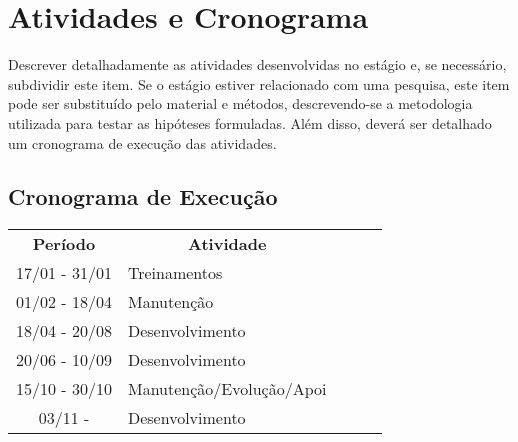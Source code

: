 \chapter[Atividades e Cronograma]{Atividades e Cronograma}

Descrever detalhadamente as atividades desenvolvidas no estágio e, se necessário, 
subdividir este item. Se o estágio estiver relacionado com uma pesquisa, este item 
pode ser substituído pelo material e métodos, descrevendo-se a metodologia utilizada 
para testar as hipóteses formuladas. Além disso, deverá ser detalhado um cronograma de 
execução das atividades.

\section{Cronograma de Execução}
\pagebreak

\begin{table}[]
\begin{tabular}{|c|l|lll}
\cline{1-2}
\textbf{Período} & \multicolumn{1}{c|}{\textbf{Atividade}}                            &  &  &  \\ \cline{1-2}
17/01 - 31/01    & Treinamentos                              &  &  &  \\ \cline{1-2}
01/02 - 18/04    & Manutenção                       &  &  &  \\ \cline{1-2}
18/04 - 20/08    & Desenvolvimento                             &  &  &  \\ \cline{1-2}
20/06 - 10/09    & Desenvolvimento  &  &  &  \\ \cline{1-2}
15/10 - 30/10    & Manutenção/Evolução/Apoi       &  &  &  \\ \cline{1-2}
03/11 -          & Desenvolvimento                     &  &  &  \\ \cline{1-2}
\end{tabular}
\end{table}
